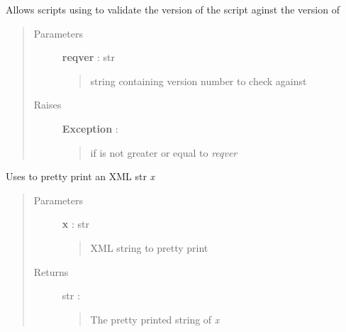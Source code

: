 \documentclass[letterpaper,10pt,english]{sphinxmanual}
\begin{document}

\begin{fulllineitems}
\label{pytan.utils:pytan.utils.version_check}
Allows scripts using {\hyperref[pytan:module-pytan]{}} to validate the version of the script
aginst the version of {\hyperref[pytan:module-pytan]{}}
\begin{quote}\begin{description}
\item[{Parameters}] \leavevmode
\textbf{reqver} : str
\begin{quote}

string containing version number to check against 
\end{quote}

\item[{Raises}] \leavevmode
\textbf{Exception} : 
\begin{quote}

if {\hyperref[pytan:pytan.__version__]{}} is not greater or equal to \emph{reqver}
\end{quote}

\end{description}\end{quote}

\end{fulllineitems}


\begin{fulllineitems}
\label{pytan.utils:pytan.utils.xml_pretty}
Uses {\hyperref[xmltodict:module-xmltodict]{}} to pretty print an XML str \emph{x}
\begin{quote}\begin{description}
\item[{Parameters}] \leavevmode
\textbf{x} : str
\begin{quote}

XML string to pretty print
\end{quote}

\item[{Returns}] \leavevmode
str :
\begin{quote}

The pretty printed string of \emph{x}
\end{quote}

\end{description}\end{quote}

\end{fulllineitems}
\end{document}
